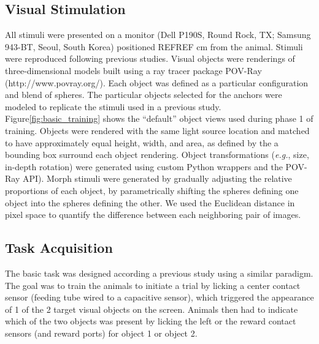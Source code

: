 \subsection{Visual Stimulation}
All stimuli were presented on a monitor (Dell P190S,
Round Rock, TX; Samsung 943-BT, Seoul, South Korea) positioned REFREF cm from the animal. Stimuli were reproduced following previous studies\cite{Zoccolan2009}. Visual objects were renderings of three-dimensional models built using a ray tracer package POV-Ray (http://www.povray.org/). Each object was defined as a particular configuration and blend of spheres. The particular objects selected for the anchors were modeled to replicate the stimuli used in a previous study\cite{Zoccolan2009}. Figure\ref{fig:basic_training} shows the ``default'' object views used during phase 1 of training. Objects were rendered with the same light source location and matched to have approximately equal height, width, and area, as defined by the a bounding box surround each object rendering. Object transformations (\textit{e.g.}, size, in-depth rotation) were generated using custom Python wrappers and the POV-Ray API). Morph stimuli were generated by gradually adjusting the relative proportions of each object, by parametrically shifting the spheres defining one object into the spheres defining the other. We used the Euclidean distance in pixel space to quantify the difference between each neighboring pair of images. 

\subsection{Task Acquisition}
The basic task was designed according a previous study using a similar paradigm\cite{Zoccolan2009}. The goal was to train the animals to initiate a trial by licking a center contact sensor (feeding tube wired to a capacitive sensor), which triggered the appearance of 1 of the 2 target visual objects on the screen. Animals then had to indicate which of the two objects was present by licking the left or the reward contact sensors (and reward ports) for object 1 or object 2. 

